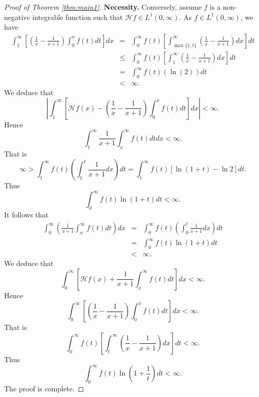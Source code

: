 \documentclass[10pt,a4paper]{amsart}
\newcommand{\Lp}[1]{L^{#1}(0,\infty)}
\begin{document}
\begin{proof}[Proof of Theorem \ref{thm:main1}]
\medskip
\textbf{Necessity.}
Conversely, assume $f$ is a non-negative integrable function such that $\mathcal{H}f\in\Lp{1}$. As $f\in\Lp{1}$, we have
\begin{eqnarray*}
\int_1^\infty\left[\left(\frac{1}{x}-\frac{1}{x+1}\right)\int_0^x f(t)dt\right]dx &=&  \int_0^\infty f(t)\left[\int_{\max\{1,t\}}^\infty\left(\frac{1}{x}-\frac{1}{x+1}\right)dx\right]dt\\ &\leq&  \int_0^\infty f(t)\left[\int_1^\infty\left(\frac{1}{x}-\frac{1}{x+1}\right)dx\right]dt\\ &=& \int_0^\infty f(t)\left(\ln(2)\right)dt\\ &<& \infty.
\end{eqnarray*}
We deduce that
$$\left\vert\int_1^\infty\left[\mathcal{H}f(x)-\left(\frac{1}{x}-\frac{1}{x+1}\right)\int_0^x f(t)dt\right]dx\right\vert<\infty.$$
Hence
$$\int_1^\infty\frac{1}{x+1}\int_x^\infty f(t)dtdx<\infty.$$
That is $$\infty>\int_1^\infty f(t)\left(\int_1^t\frac{1}{x+1}dx\right)dt=\int_1^\infty f(t)\left[\ln(1+t)-\ln2\right]dt.$$
Thus $$\int_0^\infty f(t)\ln(1+t)dt<\infty.$$
It follows that
\begin{eqnarray*}\int_0^\infty\left(\frac{1}{x+1}\int_x^\infty f(t)dt\right)dx &=& \int_0^\infty f(t)\left(\int_0^t\frac{1}{x+1}dx\right)dt\\ &=&\int_0^\infty f(t)\ln(1+t)dt\\ &<&\infty.
\end{eqnarray*}
We deduce that
$$\int_0^\infty \left[\mathcal{H}f(x)+\frac{1}{x+1}\int_x^\infty f(t)dt\right]dx<\infty.$$
Hence $$\int_0^\infty\left[\left(\frac{1}{x}-\frac{1}{x+1}\right)\int_0^x f(t)dt\right]dx<\infty.$$
That is
$$\int_0^\infty f(t)\left[\int_t^\infty\left(\frac{1}{x}-\frac{1}{x+1}\right)dx\right]dt<\infty.$$
Thus $$\int_0^\infty f(t)\ln\left(1+\frac{1}{t}\right)dt<\infty.$$
The proof is complete.
\end{proof}
\end{document}

